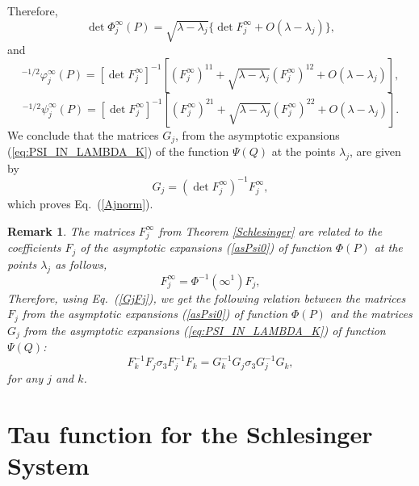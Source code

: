 \documentclass[11pt]{article}
\newtheorem{remark}{Remark}[section]
\def\be{\begin{equation}}
\def\ee{\end{equation}}
\def\ben{\begin{displaymath}}
\def\een{\end{displaymath}}
\def\l{\lambda}
\def\ph{\phi}
\def\ph{\phi^{\infty}}
\def\psih{\psi^{\infty}}
\def\phi{\varphi}
\def\la{\label}
\begin{document}
 Therefore, 
\be
\det\Phi_j^{\infty}(P)= \sqrt{\l-\l_j}\{\det F_j^{\infty}+O(\l-\l_j)\},
\ee
and
\ben
[\det \Phi_j^\infty(P)]^{-1/2}\ph_j(P)= [\det F^\infty_j]^{-1}[ (F_j^{\infty})^{11}+\sqrt{\l-\l_j}(F_j^{\infty})^{12}+O(\l-\l_j)],
\een
\ben
[\det \Phi_j^\infty(P)]^{-1/2}\psih_j(P)= [\det F^\infty_j]^{-1}[ (F_j^{\infty})^{21}+\sqrt{\l-\l_j}(F_j^{\infty})^{22}+O(\l-\l_j)].
\een
We conclude that the matrices $G_j$, from the asymptotic expansions (\ref{eq:PSI_IN_LAMBDA_K}) of the function $\Psi(Q)$ at the points $\l_j$, are given by
\be
G_j= (\det F^\infty_j)^{-1} F^\infty_j,
\la{GjFj}\ee
which proves Eq.~(\ref{Ajnorm}).
\begin{remark}\rm
The matrices $F_j^\infty$ from Theorem \ref{Schlesinger} are related to the coefficients $F_j$ of the asymptotic expansions (\ref{asPsi0}) 
of function $\Phi(P)$ at the points $\l_j$ as follows,
\ben
F_j^\infty= \Phi^{-1}(\infty^1) F_j,
\een
Therefore, using Eq.~(\ref{GjFj}), we get the following relation between the matrices $F_j$ from the asymptotic expansions (\ref{asPsi0}) of function $\Phi(P)$ and the matrices $G_j$ from the asymptotic expansions
(\ref{eq:PSI_IN_LAMBDA_K}) of function 
$\Psi(Q)$:
\be
F_k^{-1}F_j\sigma_3 F_j^{-1}F_k=G_k^{-1}G_j\sigma_3 G_j^{-1}G_k, 
\la{FFGG}\ee
for any $j$ and $k$.
\end{remark} 
 
\section{Tau function for the Schlesinger System}
\setcounter{equation}{0}
\end{document}
